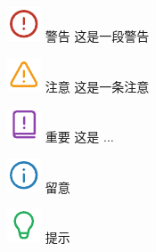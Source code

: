 








\includegraphics[scale=0.5, trim=0 +3pt 0 0]{statics/icon/caution.pdf} {\sffamily\scriptsize 警告} 这是一段警告

\includegraphics[scale=0.5, trim=0 +3pt 0 0]{statics/icon/warning.pdf} {\sffamily\scriptsize 注意} 这是一条注意

\includegraphics[scale=0.5, trim=0 +3pt 0 0]{statics/icon/important.pdf} {\sffamily\scriptsize 重要} 这是 $\ldots$

\includegraphics[scale=0.5, trim=0 +3pt 0 0]{statics/icon/note.pdf} {\sffamily\scriptsize 留意}

\includegraphics[scale=0.5, trim=0 +3pt 0 0]{statics/icon/tip.pdf} {\sffamily\scriptsize 提示}